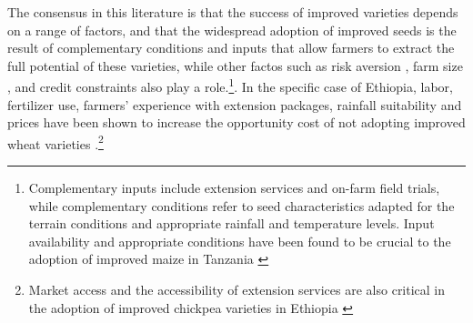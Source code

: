 \documentclass[11pt]{article}
\begin{document}



The consensus in this literature is that the success of improved varieties depends on a range of factors, and that the widespread adoption of improved seeds is the result of complementary conditions and inputs that allow farmers to extract the full potential of these varieties, while other factos such as risk aversion \citep{Holden2016-vy}, farm size \citep{Ghimire2015-bd}, and credit constraints \citep{Simtowe2008-jn,Balana2020-hx} also play a role.\footnote{Complementary inputs include extension services and on-farm field trials, while complementary conditions refer to seed characteristics adapted for the terrain conditions and appropriate rainfall and temperature levels. Input availability and appropriate conditions have been found to be crucial to the adoption of improved maize in Tanzania \citep{Kaliba2000-jh}}. In the specific case of Ethiopia, labor, fertilizer use, farmers’ experience with extension packages, rainfall suitability and prices have been shown to increase the opportunity cost of not adopting improved wheat varieties \citep{Wale2006-bv}.\footnote{Market access and the accessibility of extension services are also critical in the adoption of improved chickpea varieties in Ethiopia \citep{Verkaart2019-ol}} 


\end{document}
